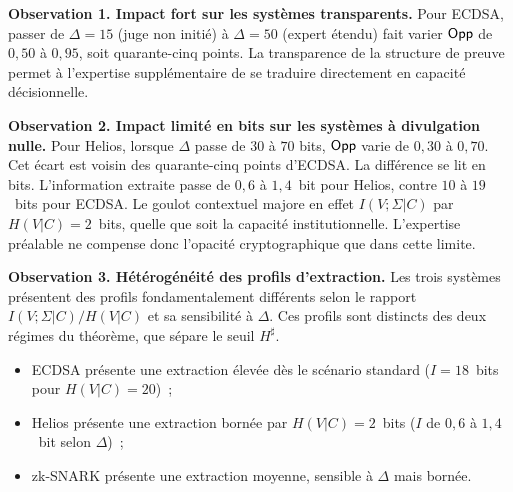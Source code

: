 \begin{sloppypar}
\noindent\textbf{Observation 1. Impact fort sur les syst\`emes
transparents.} Pour ECDSA, passer de $\Delta = 15$ (juge non initi\'e)
\`a $\Delta = 50$ (expert \'etendu) fait varier $\mathsf{Opp}$ de $0{,}50$ \`a
$0{,}95$, soit quarante-cinq points. La transparence de la structure de
preuve permet \`a l'expertise suppl\'ementaire de se traduire directement
en capacit\'e d\'ecisionnelle.

\noindent\textbf{Observation 2. Impact limit\'e en bits sur les syst\`emes
\`a divulgation nulle.} Pour Helios, lorsque $\Delta$ passe de
$30$ \`a $70$ bits, $\mathsf{Opp}$ varie de $0{,}30$ \`a $0{,}70$. Cet \'ecart est voisin
des quarante-cinq points d'ECDSA. La diff\'erence se lit en bits. L'information
extraite passe de $0{,}6$ \`a $1{,}4$~bit pour Helios, contre $10$ \`a $19$~bits pour
ECDSA. Le goulot contextuel majore en effet $I(V;\Sigma|C)$ par $H(V|C) = 2$~bits,
quelle que soit la capacit\'e institutionnelle. L'expertise pr\'ealable ne compense
donc l'opacit\'e cryptographique que dans cette limite.

\noindent\textbf{Observation 3. H\'et\'erog\'en\'eit\'e des profils d'extraction.}
Les trois syst\`emes pr\'esentent des profils fondamentalement
diff\'erents selon le rapport $I(V;\Sigma|C)/H(V|C)$ et sa sensibilit\'e \`a
$\Delta$. Ces profils sont distincts des deux r\'egimes du th\'eor\`eme, que s\'epare le seuil $H^\sharp$.
\begin{itemize}
\item ECDSA pr\'esente une extraction \'elev\'ee d\`es le sc\'enario standard ($I = 18$~bits pour $H(V|C) = 20$)~;
\item Helios pr\'esente une extraction born\'ee par $H(V|C) = 2$~bits ($I$ de $0{,}6$ \`a $1{,}4$~bit selon $\Delta$)~;
\item zk-SNARK pr\'esente une extraction moyenne, sensible \`a $\Delta$ mais born\'ee.
\end{itemize}
\end{sloppypar}

